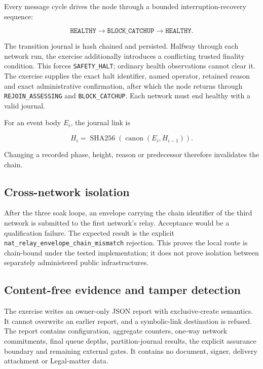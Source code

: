Every message cycle drives the node through a bounded interruption-recovery
sequence:

\begin{equation}
  \texttt{HEALTHY}
  \longrightarrow \texttt{BLOCK\_CATCHUP}
  \longrightarrow \texttt{HEALTHY}.
\end{equation}

The transition journal is hash chained and persisted.  Halfway through each
network run, the exercise additionally introduces a conflicting trusted
finality condition.  This forces
\texttt{SAFETY\_HALT}; ordinary health observations cannot clear it.  The
exercise supplies the exact halt identifier, named operator, retained reason
and exact administrative confirmation, after which the node returns through
\texttt{REJOIN\_ASSESSING} and \texttt{BLOCK\_CATCHUP}.  Each network must end
healthy with a valid journal.

For an event body $E_i$, the journal link is

\begin{equation}
  H_i = \operatorname{SHA256}\!\left(
    \operatorname{canon}(E_i,H_{i-1})
  \right).
\end{equation}

Changing a recorded phase, height, reason or predecessor therefore invalidates
the chain.

\subsection{Cross-network isolation}

After the three soak loops, an envelope carrying the chain identifier of the
third network is submitted to the first network's relay.  Acceptance would be a
qualification failure.  The expected result is the explicit
\texttt{nat\_relay\_envelope\_chain\_mismatch} rejection.  This proves the
local route is chain-bound under the tested implementation; it does not prove
isolation between separately administered public infrastructures.

\subsection{Content-free evidence and tamper detection}

The exercise writes an owner-only JSON report with exclusive-create semantics.
It cannot overwrite an earlier report, and a symbolic-link destination is
refused.  The report contains configuration, aggregate counters, one-way
network commitments, final queue depths, partition-journal results, the
explicit assurance boundary and remaining external gates.  It contains no
document, signer, delivery attachment or Legal-matter data.

